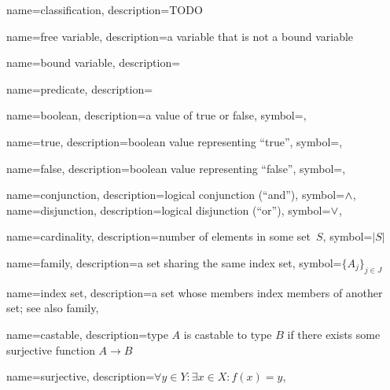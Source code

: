 %
%

\makeglossaries


{
  name={classification},
  description={TODO}
}

{
  name={free variable},
  description={a variable that is not a \gls{bound variable}}
}

{
  name={bound variable},
  description={}
}

{
  name={predicate},
  description={}
}

{
  name={boolean},
  description={a value of \gls{true} or \gls{false}},
  symbol={\Bool},
}

{
  name={true},
  description={boolean value representing ``true''},
  symbol={\true},
}

{
  name={false},
  description={boolean value representing ``false''},
  symbol={\false},
}

{
  name={conjunction},
  description={logical conjunction (``and'')},
  symbol={\ensuremath{\logand}},
}
{
  name={disjunction},
  description={logical disjunction (``or'')},
  symbol={\ensuremath{\logor}},
}

{
  name={cardinality},
  description={number of elements in some set~$S$},
  symbol={\ensuremath{|S|}}
}

{
  name={family},
  description={a set sharing the same \gls{index set}},
  symbol={\ensuremath{\{A_j\}_{j\in J}}}
}

{
  name={index set},
  description={a set whose members index members of another set; see also
               \gls{family}},
}

{
  name={castable},
  description={type $A$ is castable to type $B$ if there exists some
               \gls{surjective} function $A\rightarrow B$}
}

{
  name={surjective},
  description={$\forall y\in Y : \exists x\in X : f(x) = y$},
}

